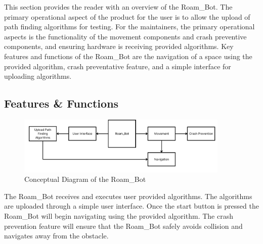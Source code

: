 
This section provides the reader with an overview of the Roam\_Bot. The primary operational aspect of the product for the user is to allow the upload of path finding algorithms for testing. For the maintainers, the primary operational aspects is the functionality of the movement components and crash preventive components, and ensuring hardware is receiving provided algorithms. Key features and functions of the Roam\_Bot are the navigation of a space using the provided algorithm, crash preventative feature, and a simple interface for uploading algorithms.

\subsection{Features \& Functions}
\begin{figure}[h!]
	\centering
    \includegraphics[width=0.90\textwidth]{images/graphic.png} %
    \caption{Conceptual Diagram of the Roam\_Bot} %
    \label{fig:conceptual} %
\end{figure}
The Roam\_Bot receives and executes user provided algorithms. The algorithms are uploaded through a simple user interface. Once the start button is pressed the Roam\_Bot will begin navigating using the provided algorithm. The crash prevention feature will ensure that the Roam\_Bot safely avoids collision and navigates away from the obstacle.

